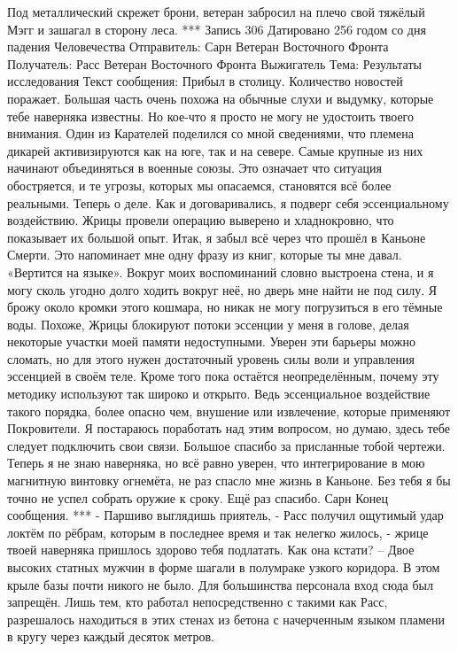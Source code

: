 \documentclass[a4paper, 12pt]{report}
\begin{document}
Под металлический скрежет брони, ветеран забросил на плечо свой тяжёлый Мэгг и зашагал в сторону леса.
***
Запись 306
Датировано 256 годом со дня падения Человечества
Отправитель: Сарн Ветеран Восточного Фронта
Получатель: Расс Ветеран Восточного Фронта Выжигатель
Тема: Результаты исследования
Текст сообщения:
	 Прибыл в столицу. Количество новостей поражает. Большая часть очень похожа на обычные слухи и выдумку, которые тебе наверняка известны. Но кое-что я просто не могу не удостоить твоего внимания.
 Один из Карателей поделился со мной сведениями, что племена дикарей активизируются как на юге, так и на севере. Самые крупные из них начинают объединяться в военные союзы. Это означает что ситуация обостряется, и те угрозы, которых мы опасаемся, становятся всё более реальными.
Теперь о деле. Как и договаривались, я подверг себя эссенциальному воздействию. Жрицы провели операцию выверено и хладнокровно, что показывает их большой опыт.
Итак, я забыл всё через что прошёл в Каньоне Смерти. Это напоминает мне одну фразу из книг, которые ты мне давал. «Вертится на языке». Вокруг моих воспоминаний словно выстроена стена, и я могу сколь угодно долго ходить вокруг неё, но дверь мне найти не под силу. Я брожу около кромки этого кошмара, но никак не могу погрузиться в его тёмные воды. Похоже, Жрицы блокируют потоки эссенции у меня в голове, делая некоторые участки моей памяти недоступными. Уверен эти барьеры можно сломать, но для этого нужен достаточный уровень силы воли и управления эссенцией в своём теле. Кроме того пока остаётся неопределённым, почему эту методику используют так широко и открыто. Ведь эссенциальное воздействие такого порядка, более опасно чем, внушение или извлечение, которые применяют Покровители. Я постараюсь поработать над этим вопросом, но думаю, здесь тебе следует подключить свои связи.
Большое спасибо за присланные тобой чертежи. Теперь я не знаю наверняка, но всё равно уверен, что интегрирование в мою магнитную винтовку огнемёта, не раз спасло мне жизнь в Каньоне. Без тебя я бы точно не успел собрать оружие к сроку. Ещё раз спасибо.
Сарн
Конец сообщения. 
***
	- Паршиво выглядишь приятель, - Расс получил ощутимый удар локтём по рёбрам, которым в последнее время и так нелегко жилось, - жрице твоей наверняка пришлось здорово тебя подлатать. Как она кстати? –
	Двое высоких статных мужчин в форме шагали в полумраке узкого коридора. В этом крыле базы почти никого не было. Для большинства персонала вход сюда был запрещён. Лишь тем, кто работал непосредственно с такими как Расс, разрешалось находиться в этих стенах из бетона с начерченным языком пламени в кругу через каждый десяток метров.
\end{document}
